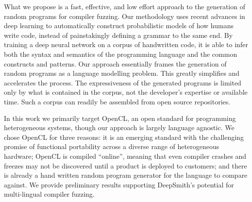 What we propose is a fast, effective, and low effort approach to the generation
of random programs for compiler fuzzing. Our methodology uses recent advances in
deep learning to automatically construct probabilistic models of how humans
write code, instead of painstakingly defining a grammar to the same end. By
training a deep neural network on a corpus of handwritten code, it is able to
infer both the syntax and semantics of the programming language and the common
constructs and patterns. Our approach essentially frames the generation of
random programs as a language modelling problem. This greatly simplifies and
accelerates the process. The expressiveness of the generated programs is limited
only by what is contained in the corpus, not the developer's expertise or
available time. Such a corpus can readily be assembled from open source
repositories.

In this work we primarily target OpenCL, an open standard for programming
heterogeneous systems, though our approach is largely language agnostic. We
chose OpenCL for three reasons: it is an emerging standard with the challenging
promise of functional portability across a diverse range of heterogeneous
hardware; OpenCL is compiled ``online'', meaning that even compiler crashes and
freezes may not be discovered until a product is deployed to customers; and
there is already a hand written random program generator for the language to
compare against. We provide preliminary results supporting DeepSmith's potential
for multi-lingual compiler fuzzing.
